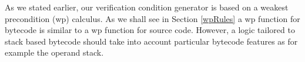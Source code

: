 As we stated earlier, our verification condition generator is based on a weakest precondition (wp) calculus. As we shall see in Section  \ref{wpRules}
a wp function for bytecode is similar to a wp function for source code. However, a logic tailored to stack based bytecode should take into account 
particular bytecode features as for example the operand stack.



 





 
